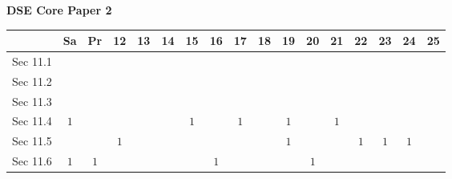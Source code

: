 \documentclass[12pt, a4paper]{article}
\begin{document}
\begin{absolutelynopagebreak}
\begin{center}
\textbf{DSE Core Paper 2}
\end{center}
\begin{center}
\begin{tabular}{|l|c|c|c|c|c|c|c|c|c|c|c|c|c|c|c|c|}
\hline
        & Sa & Pr & 12 & 13 & 14 & 15 & 16 & 17 & 18 & 19 & 20 & 21 & 22 & 23 & 24 & 25 \\\hline\hline
Sec 11.1 &  &  &  &  &  &  &  &  &  &  &  &  &  &  &  &  \\\hline
Sec 11.2 &  &  &  &  &  &  &  &  &  &  &  &  &  &  &  &  \\\hline
Sec 11.3 &  &  &  &  &  &  &  &  &  &  &  &  &  &  &  &  \\\hline
Sec 11.4 &  $1$ &  &  &  &  &  $1$ &  &  $1$ &  &  $1$ &  &  $1$ &  &  &  &  \\\hline
Sec 11.5 &  &  &  $1$ &  &  &  &  &  &  &  $1$ &  &  &  $1$ &  $1$ &  $1$ &  \\\hline
Sec 11.6 &  $1$ &  $1$ &  &  &  &  &  $1$ &  &  &  &  $1$ &  &  &  &  &  \\\hline
\end{tabular}
\end{center}
\end{absolutelynopagebreak}
\end{document}

